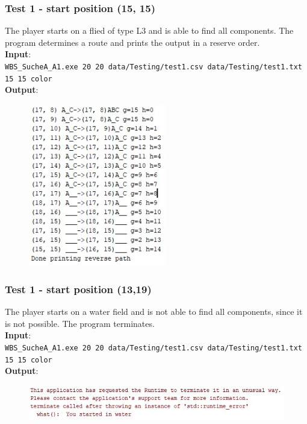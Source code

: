 \documentclass{article}
\begin{document}
\subsubsection*{Test 1 - start position (15, 15)}
The player starts on a flied of type L3 and is able to find all components. The program determines a route and prints the output in a reserve order. \\
\textbf{Input}:\\
\texttt{WBS\_SucheA\_A1.exe 20 20 data/Testing/test1.csv data/Testing/test1.txt 15 15 color}\\
\textbf{Output}:
\begin{figure}[H]
\includegraphics[width=6cm]{start1515}
\centering
\end{figure}

\subsubsection*{Test 1 - start position (13,19)}
The player starts on a water field and is not able to find all components, since it is not possible. The program terminates. \\
\textbf{Input}:\\
\texttt{WBS\_SucheA\_A1.exe 20 20 data/Testing/test1.csv data/Testing/test1.txt 15 15 color}\\
\textbf{Output}:
\begin{figure}[H]
\includegraphics[width=14cm]{waterstart}
\centering
\end{figure}
\end{document}
